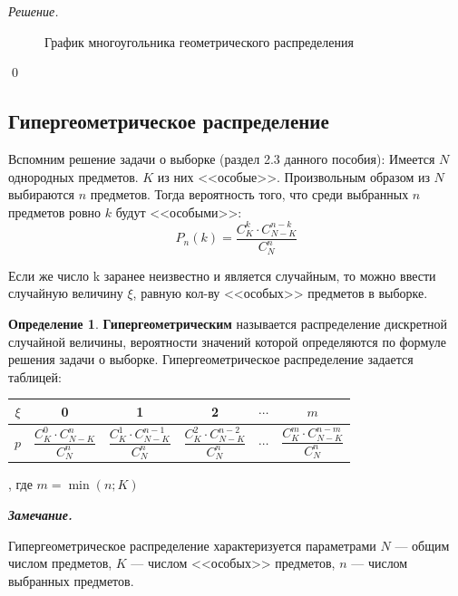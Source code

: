 \documentclass[12pt,a4paper]{article}
\theoremstyle{definition}
\newtheorem{definition}{Определение}[section]
\theoremstyle{definition}
\theoremstyle{remark}
\newenvironment{remark}{
  \par\noindent\textbf{\textit{Замечание.}}~
}{\par}
\theoremstyle{corollary}
\theoremstyle{bolditalic}
\newenvironment{solution}{
    \vspace{0.5em}
    \noindent\textit{Решение.}
}{\qed\vspace{1em}}
\begin{document}
\begin{solution}
\begin{figure}[h!]
    \caption{График многоугольника геометрического распределения}
\end{figure}
 \end{solution}

\subsection{Гипергеометрическое распределение}

Вспомним решение задачи о выборке (раздел 2.3 данного пособия): Имеется $N$ однородных предметов. $K$ из них <<особые>>. Произвольным образом из $N$ выбираются $n$ предметов. Тогда вероятность того, что среди выбранных $n$ предметов ровно $k$ будут <<особыми>>:
\[
P_n(k) = \frac{C_K^k \cdot C_{N-K}^{n-k}}{C_N^{n}}
\]

Если же число k заранее неизвестно и является случайным, то можно ввести случайную величину $\xi$, равную кол-ву <<особых>> предметов в выборке.

\begin{definition}
    \textbf{Гипергеометрическим} называется распределение дискретной случайной величины, вероятности значений которой определяются по формуле решения задачи о выборке. Гипергеометрическое распределение задается таблицей:\\

     \begin{center}
\begin{tabular}{|*{6}{c|}}
\hline
$\xi$ & 0 & 1 & 2 & $\cdots$ & $m$ \\
\hline
$p$ & $\dfrac{C_K^0 \cdot C_{N-K}^{n}}{C_N^{n}}$ & $\dfrac{C_K^1 \cdot C_{N-K}^{n-1}}{C_N^{n}}$ & $\dfrac{C_K^2 \cdot C_{N-K}^{n-2}}{C_N^{n}}$ & $\cdots$ & $\dfrac{C_K^m \cdot C_{N-K}^{n-m}}{C_N^{n}}$ \\
\hline
\end{tabular}
\end{center}

, где $m=\min(n; K)$
\end{definition}

\begin{remark}
 Гипергеометрическое распределение характеризуется параметрами $N$ --- общим числом предметов, $K$ --- числом <<особых>> предметов, $n$ --- числом выбранных предметов.
\end{remark}
\end{document}
